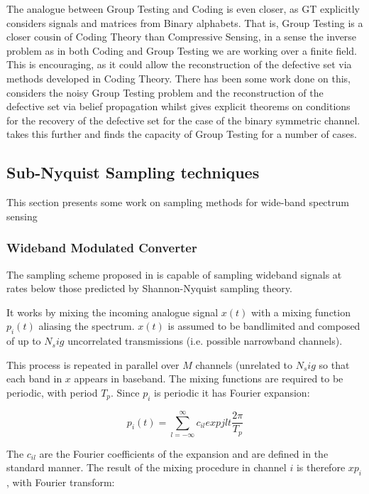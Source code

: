 The analogue between Group Testing and Coding is even closer, as GT explicitly considers signals and matrices from Binary alphabets. That is, Group Testing is a closer cousin of Coding Theory than Compressive Sensing, in a sense the inverse problem as in both Coding and Group Testing we are working over a finite field. This is encouraging, as it could allow the reconstruction of the defective set via methods developed in Coding Theory. There has been some work done on this, \cite{Sejdinovic2010} considers the noisy Group Testing problem and the reconstruction of the defective set via belief propagation whilst \cite{Wadayama2013} gives explicit theorems on conditions for the recovery of the defective set for the case of the binary symmetric channel. \cite{Baldassini2013} takes this further and finds the capacity of Group Testing for a number of cases. 

\subsection{Sub-Nyquist Sampling techniques}
This section presents some work on sampling methods for wide-band spectrum sensing

\subsubsection{Wideband Modulated Converter} 
The sampling scheme proposed in \cite{Mishali2010} is capable of sampling wideband signals at rates below those predicted by Shannon-Nyquist sampling theory. 

It works by mixing the incoming analogue signal \(x\left(t\right)\) with a mixing function \(p_i\left(t\right)\) aliasing the spectrum. \(x\left(t\right)\) is assumed to be bandlimited and composed of up to \(N_sig\) uncorrelated transmissions (i.e. possible narrowband channels). 

This process is repeated in parallel over \(M\) channels (unrelated to \(N_sig\) so that each band in \(x\) appears in baseband. The mixing functions are required to be periodic, with period \(T_p\). Since \(p_i\) is periodic it has Fourier expansion:

\begin{equation}
p_i\left(t\right) = \sum_{l=-\infty}^{\infty} c_{il} exp{jlt\frac{2\pi}{T_p}}
\end{equation}

The \(c_{il}\) are the Fourier coefficients of the expansion and are defined in the standard manner. The result of the mixing procedure in channel \(i\) is therefore \(xp_i\), with Fourier transform:

